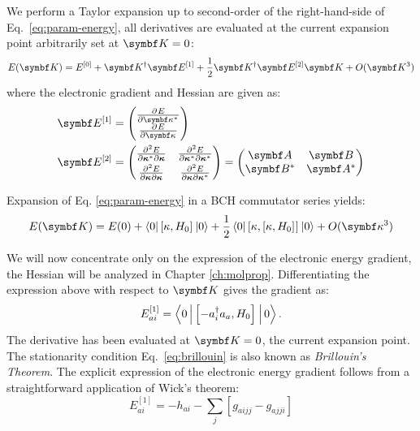 We perform a Taylor expansion up to second-order of the right-hand-side
of Eq.~\eqref{eq:param-energy}, all derivatives are evaluated at the
current expansion point arbitrarily set at
$\vect{K}=0$:
\begin{equation}\label{eq:taylor-exp}
 E(\vect{K}) = E^{[0]} +\vect{K}^\dagger \mat{E}^{[1]} + \frac{1}{2}\vect{K}^\dagger \mat{E}^{[2]}\vect{K} + O(\vect{K}^3)
\end{equation}
where the electronic gradient and Hessian are given as:
\begin{subequations}
 \begin{align}
 \mat{E}^{[1]}
&=
\begin{pmatrix}
 \pderiv{E}{{\vect{\kappa}^*}} \\
 \pderiv{E}{{\vect{\kappa}}}
\end{pmatrix}
\\
\mat{E}^{[2]}
&=
\begin{pmatrix}
 \frac{\partial^2 E}{\partial\boldsymbol{\kappa}^*\partial\boldsymbol{\kappa}} &
 \frac{\partial^2 E}{\partial\boldsymbol{\kappa}^*\partial\boldsymbol{\kappa}^*} \\[0.3em]
 \frac{\partial^2 E}{\partial\boldsymbol{\kappa}\partial\boldsymbol{\kappa}} &
 \frac{\partial^2 E}{\partial\boldsymbol{\kappa}\partial\boldsymbol{\kappa}^*}
\end{pmatrix}
=
\begin{pmatrix}
                  \mat{A} & \mat{B} \\
                  \mat{B}^* & \mat{A}^*
\end{pmatrix}
 \end{align}
\end{subequations}

Expansion of Eq. \eqref{eq:param-energy} in a \gls{BCH}
commutator series yields:\autocite{Arfken2013-pt}
\begin{equation}
 E(\vect{K}) = E(0) + \braket{0|\commutator{\kappa}{H_0}|0} +\frac{1}{2}\braket{0|\commutator{\kappa}{\commutator{\kappa}{H_0}}|0}+O(\vect{\kappa}^3)
\end{equation}

We will now concentrate only on the expression of the electronic energy
gradient, the Hessian will be analyzed in Chapter
\ref{ch:molprop}.
Differentiating the expression above with respect to $\vect{K}$ gives the gradient as:
\begin{equation}\label{eq:brillouin}
 E^{[1]}_{ai} = \Braket{0|\left[ -a_{i}^{\dagger}a_{a}, H_0 \right]^{}|0}.
\end{equation}
The derivative has been evaluated at $\vect{K}=0$, \ie the current
expansion point. The stationarity condition Eq.~\eqref{eq:brillouin} is
also known as \emph{Brillouin's Theorem}.
The explicit expression of the electronic energy gradient follows from a
straightforward application of Wick's theorem:\autocite{Wick1950-iy,
Shavitt2009-mr}
\begin{equation}\label{eq:stationary}
  E^{[1]}_{ai} = -h_{ai} - \sum_{j}[g_{aijj} - g_{ajji}]
\end{equation}

